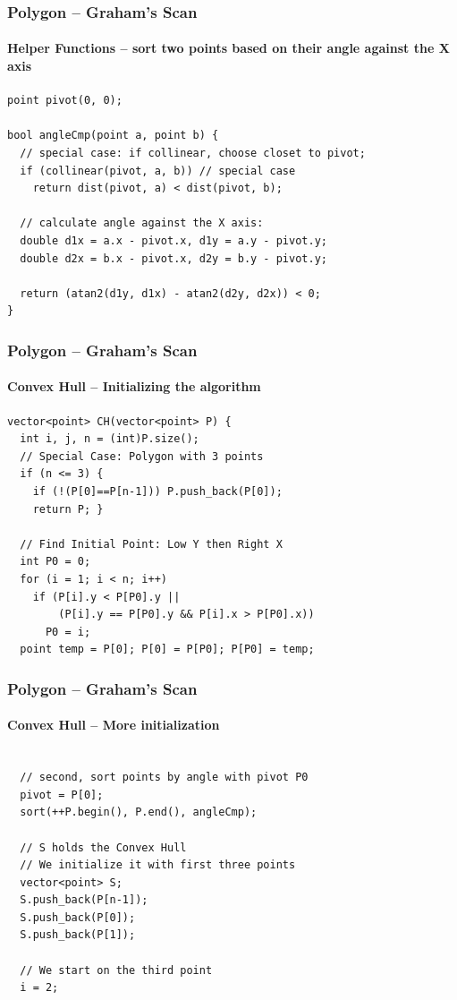 \begin{frame}[fragile]
  \frametitle{Polygon -- Graham's Scan}
  \framesubtitle{Helper Functions -- sort two points based on their angle against the X axis}

{\small
\begin{exampleblock}{}
\begin{verbatim}
point pivot(0, 0);

bool angleCmp(point a, point b) {
  // special case: if collinear, choose closet to pivot;
  if (collinear(pivot, a, b)) // special case
    return dist(pivot, a) < dist(pivot, b);

  // calculate angle against the X axis:
  double d1x = a.x - pivot.x, d1y = a.y - pivot.y;
  double d2x = b.x - pivot.x, d2y = b.y - pivot.y;

  return (atan2(d1y, d1x) - atan2(d2y, d2x)) < 0;
}
\end{verbatim}
\end{exampleblock}
}
\end{frame}

\begin{frame}[fragile]
  \frametitle{Polygon -- Graham's Scan}
  \framesubtitle{Convex Hull -- Initializing the algorithm}

  {\small
    \begin{exampleblock}{}
\begin{verbatim}
vector<point> CH(vector<point> P) {
  int i, j, n = (int)P.size();
  // Special Case: Polygon with 3 points
  if (n <= 3) {
    if (!(P[0]==P[n-1])) P.push_back(P[0]);
    return P; }

  // Find Initial Point: Low Y then Right X
  int P0 = 0;
  for (i = 1; i < n; i++)
    if (P[i].y < P[P0].y ||
        (P[i].y == P[P0].y && P[i].x > P[P0].x))
      P0 = i;
  point temp = P[0]; P[0] = P[P0]; P[P0] = temp;
\end{verbatim}
\end{exampleblock}}
\end{frame}

\begin{frame}[fragile]
  \frametitle{Polygon -- Graham's Scan}
  \framesubtitle{Convex Hull -- More initialization}
  {\small
    \begin{exampleblock}{}

\begin{verbatim}

  // second, sort points by angle with pivot P0
  pivot = P[0];
  sort(++P.begin(), P.end(), angleCmp);

  // S holds the Convex Hull
  // We initialize it with first three points
  vector<point> S;
  S.push_back(P[n-1]);
  S.push_back(P[0]);
  S.push_back(P[1]);

  // We start on the third point
  i = 2;
\end{verbatim}

    \end{exampleblock}
  }
\end{frame}

